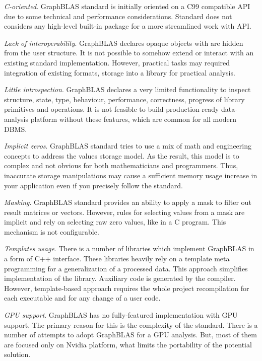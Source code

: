 \textit{C-oriented}. GraphBLAS standard is initially oriented on a C99 compatible API due to some technical and performance considerations. Standard does not considers any high-level built-in package for a more streamlined work with API.

\textit{Lack of interoperability}. GraphBLAS declares opaque objects with are hidden from the user structure. It is not possible to somehow extend or interact with an existing standard implementation. However, practical tasks may required integration of existing formats, storage into a library for practical analysis. 

\textit{Little introspection}. GraphBLAS declares a very limited functionality to inspect structure, state, type, behaviour, performance, correctness, progress of library primitives and operations. It is not feasible to build production-ready data-analysis platform without these features, which are common for all modern DBMS.

\textit{Implicit zeros}. GraphBLAS standard tries to use a mix of math and engineering concepts to address the values storage model. As the result, this model is to complex and not obvious for both mathematicians and programmers. Thus, inaccurate storage manipulations may cause a sufficient memory usage increase in your application even if you precisely follow the standard.

\textit{Masking}. GraphBLAS standard provides an ability to apply a mask to filter out result matrices or vectors. However, rules for selecting values from a mask are implicit and rely on selecting raw zero values, like in a C program. This mechanism is not configurable.

\textit{Templates usage}. There is a number of libraries which implement GraphBLAS in a form of C++ interface. These libraries heavily rely on a template meta programming for a generalization of a processed data. This approach simplifies implementation of the library. Auxiliary code is generated by the compiler. However, template-based approach requires the whole project recompilation for each executable and for any change of a user code.

\textit{GPU support}. GraphBLAS has no fully-featured implementation with GPU support. The primary reason for this is the complexity of the standard. There is a number of attempts to adopt GraphBLAS for a GPU analysis. But, most of them are focused only on Nvidia platform, what limits the portability of the potential solution.